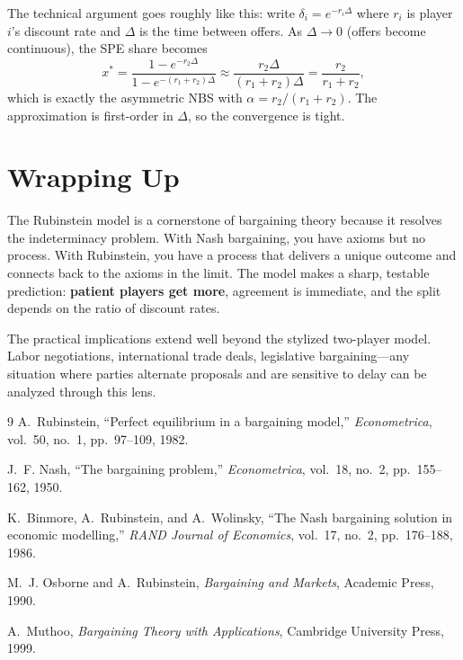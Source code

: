 \documentclass[11pt]{article}
\begin{document}
The technical argument goes roughly like this: write $\delta_i = e^{-r_i \Delta}$ where $r_i$ is player $i$'s discount rate and $\Delta$ is the time between offers. As $\Delta \to 0$ (offers become continuous), the SPE share becomes
\[
x^* = \frac{1 - e^{-r_2 \Delta}}{1 - e^{-(r_1 + r_2)\Delta}} \approx \frac{r_2 \Delta}{(r_1 + r_2)\Delta} = \frac{r_2}{r_1 + r_2},
\]
which is exactly the asymmetric NBS with $\alpha = r_2/(r_1 + r_2)$. The approximation is first-order in $\Delta$, so the convergence is tight.

\section{Wrapping Up}

The Rubinstein model is a cornerstone of bargaining theory because it resolves the indeterminacy problem. With Nash bargaining, you have axioms but no process. With Rubinstein, you have a process that delivers a unique outcome and connects back to the axioms in the limit. The model makes a sharp, testable prediction: \textbf{patient players get more}, agreement is immediate, and the split depends on the ratio of discount rates.

The practical implications extend well beyond the stylized two-player model. Labor negotiations, international trade deals, legislative bargaining---any situation where parties alternate proposals and are sensitive to delay can be analyzed through this lens.

\begin{thebibliography}{9}
 A.~Rubinstein, ``Perfect equilibrium in a bargaining model,'' \textit{Econometrica}, vol.~50, no.~1, pp.~97--109, 1982.

 J.~F. Nash, ``The bargaining problem,'' \textit{Econometrica}, vol.~18, no.~2, pp.~155--162, 1950.

 K.~Binmore, A.~Rubinstein, and A.~Wolinsky, ``The Nash bargaining solution in economic modelling,'' \textit{RAND Journal of Economics}, vol.~17, no.~2, pp.~176--188, 1986.

 M.~J. Osborne and A.~Rubinstein, \textit{Bargaining and Markets}, Academic Press, 1990.

 A.~Muthoo, \textit{Bargaining Theory with Applications}, Cambridge University Press, 1999.
\end{thebibliography}
\end{document}
